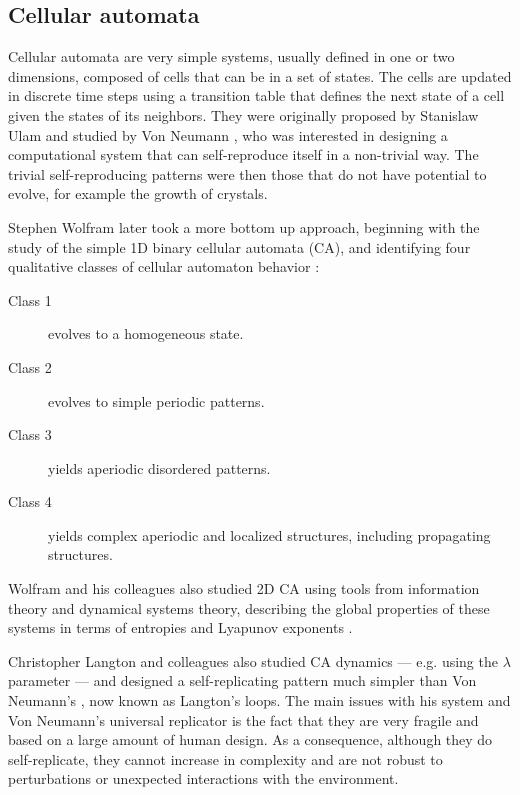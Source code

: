 \subsection{Cellular automata}

Cellular automata are very simple systems, usually defined in one or two
dimensions, composed of cells that can be in a set of states. The cells are
updated in discrete time steps using a transition table that defines the next
state of a cell given the states of its neighbors.
They were originally proposed by Stanislaw Ulam and studied by Von Neumann
\parencite{von_neumann_theory_1966}, who was interested in designing a computational
system that can self-reproduce itself in a non-trivial way. The trivial
self-reproducing patterns were then those that do not have potential to evolve,
for example the growth of crystals.

Stephen Wolfram later took a more bottom up approach, beginning with the study
of the simple 1D binary cellular automata (CA), and identifying four qualitative
classes of cellular automaton behavior \parencite{wolfram_universality_1984}:
\begin{description}
\item[Class 1]  evolves to a homogeneous state.
\item[Class 2]  evolves to simple periodic patterns.
\item[Class 3]  yields aperiodic disordered patterns.
\item[Class 4]  yields complex aperiodic and localized structures, including
  propagating structures.
\end{description}
Wolfram and his colleagues also studied 2D CA using tools from information
theory and dynamical systems theory, describing the global properties of
these systems in terms of entropies and
Lyapunov exponents \parencite{packard_two-dimensional_1985}.

Christopher Langton and colleagues also studied CA dynamics
\parencite{li_transition_1990} --- e.g. using the $\lambda$ parameter
\parencite{langton_computation_1990} --- and designed a self-replicating pattern much
simpler than Von Neumann's \parencite{langton_self-reproduction_1984}, now known as
Langton's loops. The main issues with his system and Von Neumann's universal
replicator is the fact that they are very fragile and based on a large amount of
human design. As a consequence, although they do self-replicate, they cannot
increase in complexity and are not robust to perturbations or unexpected
interactions with the environment.

